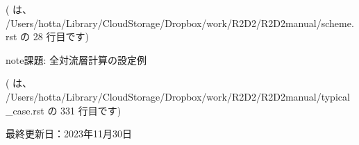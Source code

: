 \documentclass[letterpaper,10pt,dvipdfmx,report]{sphinxmanual}
\begin{document}
\sphinxAtStartPar
({\hyperref[\detokenize{scheme:id6}]{}} は、 /Users/hotta/Library/CloudStorage/Dropbox/work/R2D2/R2D2\sphinxhyphen{}manual/scheme.rst の 28 行目です)

\begin{sphinxadmonition}{note}{課題:}
\sphinxAtStartPar
全対流層計算の設定例
\end{sphinxadmonition}

\sphinxAtStartPar
({\hyperref[\detokenize{typical_case:id10}]{}} は、 /Users/hotta/Library/CloudStorage/Dropbox/work/R2D2/R2D2\sphinxhyphen{}manual/typical\_case.rst の 331 行目です)

\sphinxAtStartPar
最終更新日：2023年11月30日


\renewcommand{\indexname}{Pythonモジュール索引}
\begin{sphinxtheindex}
\let\bigletter\sphinxstyleindexlettergroup
\bigletter{r}
\item\relax{}
\end{sphinxtheindex}

\renewcommand{\indexname}{索引}
\printindex
\end{document}
